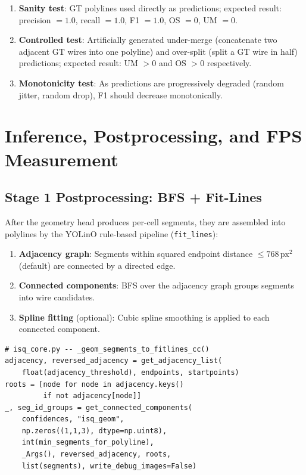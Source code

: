 \documentclass[11pt,a4paper]{article}
\begin{document}
\begin{enumerate}
  \item \textbf{Sanity test}: GT polylines used directly as predictions;
        expected result: precision $= 1.0$, recall $= 1.0$, F1 $= 1.0$,
        OS $= 0$, UM $= 0$.

  \item \textbf{Controlled test}: Artificially generated under-merge
        (concatenate two adjacent GT wires into one polyline) and
        over-split (split a GT wire in half) predictions;
        expected result: UM $> 0$ and OS $> 0$ respectively.

  \item \textbf{Monotonicity test}: As predictions are progressively degraded
        (random jitter, random drop), F1 should decrease monotonically.
\end{enumerate}

\section{Inference, Postprocessing, and FPS Measurement}
\label{sec:inference}

\subsection{Stage 1 Postprocessing: BFS + Fit-Lines}
\label{subsec:postproc}

After the geometry head produces per-cell segments, they are assembled into polylines
by the YOLinO rule-based pipeline (\texttt{fit\_lines}):

\begin{enumerate}[leftmargin=*]
  \item \textbf{Adjacency graph}: Segments within squared endpoint distance
        $\leq 768 \,\text{px}^2$ (default) are connected by a directed edge.
  \item \textbf{Connected components}: BFS over the adjacency graph groups
        segments into wire candidates.
  \item \textbf{Spline fitting} (optional): Cubic spline smoothing is applied
        to each connected component.
\end{enumerate}

\begin{lstlisting}
# isq_core.py -- _geom_segments_to_fitlines_cc()
adjacency, reversed_adjacency = get_adjacency_list(
    float(adjacency_threshold), endpoints, startpoints)
roots = [node for node in adjacency.keys()
         if not adjacency[node]]
_, seg_id_groups = get_connected_components(
    confidences, "isq_geom",
    np.zeros((1,1,3), dtype=np.uint8),
    int(min_segments_for_polyline),
    _Args(), reversed_adjacency, roots,
    list(segments), write_debug_images=False)
\end{lstlisting}
\end{document}
